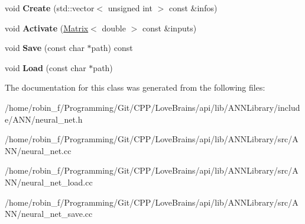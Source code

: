 \begin{DoxyCompactItemize}
\item 
\hypertarget{class_g_a_n_n_1_1_a_n_n_a65b8b6fd67dc3a07a40a39cc611af319}{}void {\bfseries Create} (std\+::vector$<$ unsigned int $>$ const \&infos)\label{class_g_a_n_n_1_1_a_n_n_a65b8b6fd67dc3a07a40a39cc611af319}

\item 
\hypertarget{class_g_a_n_n_1_1_a_n_n_a6e5ff8d7eaf90d7f38547763efcb4ab7}{}void {\bfseries Activate} (\hyperlink{class_g_a_n_n_1_1_matrix}{Matrix}$<$ double $>$ const \&inputs)\label{class_g_a_n_n_1_1_a_n_n_a6e5ff8d7eaf90d7f38547763efcb4ab7}

\item 
\hypertarget{class_g_a_n_n_1_1_a_n_n_a523bdbe95d22035e8019868f619aa50e}{}void {\bfseries Save} (const char $\ast$path) const \label{class_g_a_n_n_1_1_a_n_n_a523bdbe95d22035e8019868f619aa50e}

\item 
\hypertarget{class_g_a_n_n_1_1_a_n_n_a6509ae3de47262d62a68056c24d06b92}{}void {\bfseries Load} (const char $\ast$path)\label{class_g_a_n_n_1_1_a_n_n_a6509ae3de47262d62a68056c24d06b92}

\end{DoxyCompactItemize}


The documentation for this class was generated from the following files\+:\begin{DoxyCompactItemize}
\item 
/home/robin\+\_\+f/\+Programming/\+Git/\+C\+P\+P/\+Love\+Brains/api/lib/\+A\+N\+N\+Library/include/\+A\+N\+N/neural\+\_\+net.\+h\item 
/home/robin\+\_\+f/\+Programming/\+Git/\+C\+P\+P/\+Love\+Brains/api/lib/\+A\+N\+N\+Library/src/\+A\+N\+N/neural\+\_\+net.\+cc\item 
/home/robin\+\_\+f/\+Programming/\+Git/\+C\+P\+P/\+Love\+Brains/api/lib/\+A\+N\+N\+Library/src/\+A\+N\+N/neural\+\_\+net\+\_\+load.\+cc\item 
/home/robin\+\_\+f/\+Programming/\+Git/\+C\+P\+P/\+Love\+Brains/api/lib/\+A\+N\+N\+Library/src/\+A\+N\+N/neural\+\_\+net\+\_\+save.\+cc\end{DoxyCompactItemize}
